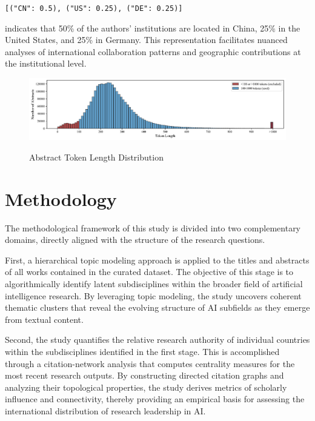 \documentclass{article}
\begin{document}
\begin{center}
	\texttt{[("CN": 0.5), ("US": 0.25), ("DE": 0.25)]}
\end{center}

indicates that 50\% of the authors’ institutions are located in China, 25\% in the United States, and 25\% in Germany. This representation facilitates nuanced analyses of international collaboration patterns and geographic contributions at the institutional level.

\begin{figure}[!p]
	\centering
	\caption{Abstract Token Length Distribution}
	\vspace{1em}
	\includegraphics[width=\linewidth]{resources/abstract_token_length_distribution_008.pdf}
	\label{fig:abstract_distribution_histogram}
\end{figure}



\section{Methodology}

The methodological framework of this study is divided into two complementary domains, directly aligned with the structure of the research questions. 

First, a hierarchical topic modeling approach is applied to the titles and abstracts of all works contained in the curated dataset. The objective of this stage is to algorithmically identify latent subdisciplines within the broader field of artificial intelligence research. By leveraging topic modeling, the study uncovers coherent thematic clusters that reveal the evolving structure of AI subfields as they emerge from textual content.

Second, the study quantifies the relative research authority of individual countries within the subdisciplines identified in the first stage. This is accomplished through a citation-network analysis that computes centrality measures for the most recent research outputs. By constructing directed citation graphs and analyzing their topological properties, the study derives metrics of scholarly influence and connectivity, thereby providing an empirical basis for assessing the international distribution of research leadership in AI.
\end{document}

